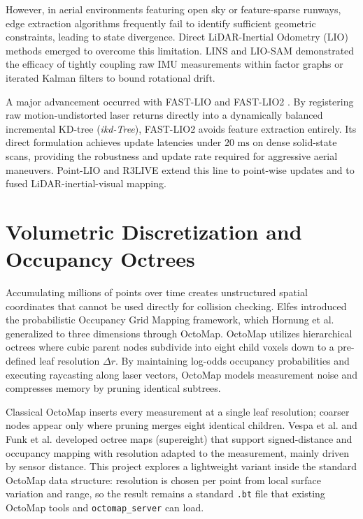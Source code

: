 \documentclass[11pt,a4paper]{report}
\begin{document}
However, in aerial environments featuring open sky or feature-sparse runways, edge extraction algorithms frequently fail to identify sufficient geometric constraints, leading to state divergence. Direct LiDAR-Inertial Odometry (LIO) methods emerged to overcome this limitation. LINS \cite{qin2020lins} and LIO-SAM \cite{shan2020liosam} demonstrated the efficacy of tightly coupling raw IMU measurements within factor graphs or iterated Kalman filters to bound rotational drift. 

A major advancement occurred with FAST-LIO \cite{xu2021fastlio} and FAST-LIO2 \cite{xu2022fastlio2}. By registering raw motion-undistorted laser returns directly into a dynamically balanced incremental KD-tree (\textit{ikd-Tree}), FAST-LIO2 avoids feature extraction entirely. Its direct formulation achieves update latencies under $20\text{ ms}$ on dense solid-state scans, providing the robustness and update rate required for aggressive aerial maneuvers. Point-LIO \cite{he2023point} and R3LIVE \cite{lin2022r3live} extend this line to point-wise updates and to fused LiDAR-inertial-visual mapping.

\section{Volumetric Discretization and Occupancy Octrees}
Accumulating millions of points over time creates unstructured spatial coordinates that cannot be used directly for collision checking. Elfes \cite{elfes1989occupancy} introduced the probabilistic Occupancy Grid Mapping framework, which Hornung et al. \cite{hornung2013octomap} generalized to three dimensions through OctoMap. OctoMap utilizes hierarchical octrees where cubic parent nodes subdivide into eight child voxels down to a pre-defined leaf resolution $\Delta r$. By maintaining log-odds occupancy probabilities and executing raycasting along laser vectors, OctoMap models measurement noise and compresses memory by pruning identical subtrees.

Classical OctoMap inserts every measurement at a single leaf resolution; coarser nodes appear only where pruning merges eight identical children. Vespa et al. \cite{vespa2018efficient} and Funk et al. \cite{funk2021multires} developed octree maps (supereight) that support signed-distance and occupancy mapping with resolution adapted to the measurement, mainly driven by sensor distance. This project explores a lightweight variant inside the standard OctoMap data structure: resolution is chosen per point from local surface variation and range, so the result remains a standard \texttt{.bt} file that existing OctoMap tools and \texttt{octomap\_server} can load.
\end{document}

